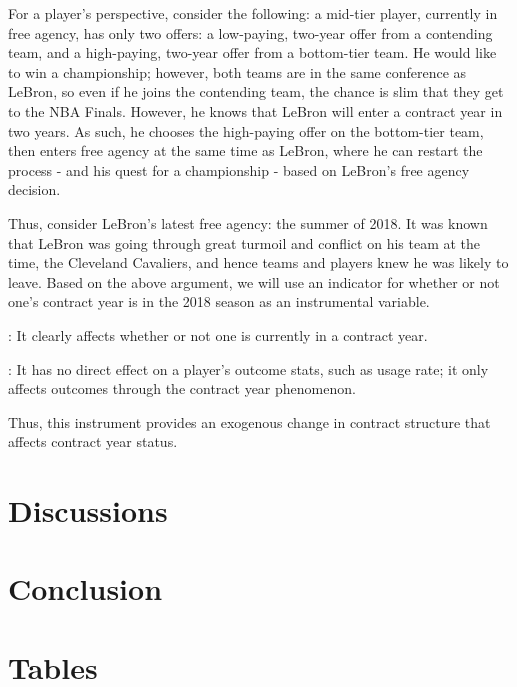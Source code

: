\documentclass[12pt]{article}
\begin{document}
For a player’s perspective, consider the following: a mid-tier player, currently in free agency, has only two offers: a low-paying, two-year offer from a contending team, and a high-paying, two-year offer from a bottom-tier team. He would like to win a championship; however, both teams are in the same conference as LeBron, so even if he joins the contending team, the chance is slim that they get to the NBA Finals. However, he knows that LeBron will enter a contract year in two years. As such, he chooses the high-paying offer on the bottom-tier team, then enters free agency at the same time as LeBron, where he can restart the process - and his quest for a championship - based on LeBron’s free agency decision.

Thus, consider LeBron’s latest free agency: the summer of 2018. It was known that LeBron was going through great turmoil and conflict on his team at the time, the Cleveland Cavaliers, and hence teams and players knew he was likely to leave. Based on the above argument, we will use an indicator for whether or not one’s contract year is in the 2018 season as an instrumental variable.

: It clearly affects whether or not one is currently in a contract year.

: It has no direct effect on a player’s outcome stats, such as usage rate; it only affects outcomes through the contract year phenomenon.

Thus, this instrument provides an exogenous change in contract structure that affects contract year status.

	\section{Discussions} \label{sec:discussion}
	
	\section{Conclusion} \label{sec:conclusion}
	
	
	
	\singlespacing
	
	
	
	
	
	\clearpage
	
	\onehalfspacing
	
	\section*{Tables} \label{sec:tab}
	
\end{document}
